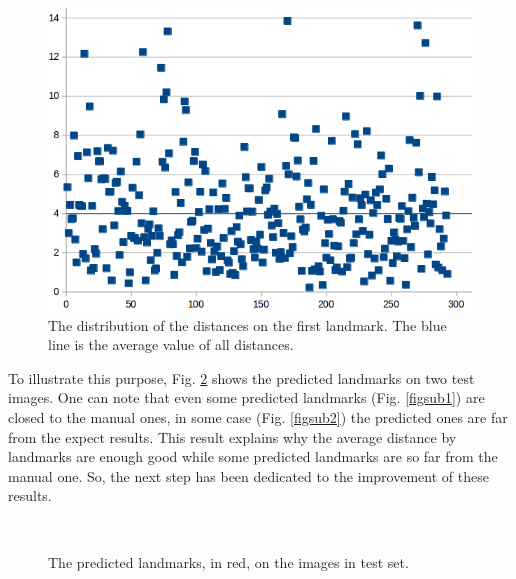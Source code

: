 \documentclass[review]{elsarticle}
\begin{document}
\begin{figure}[htbp]
	\centerline{\includegraphics[scale=0.3]{images/statistic_pronotum_from_scratch_lm1}}
	\caption{The distribution of the distances on the first landmark. The blue line is the average value of all distances.}
	\label{figchartlm1}
\end{figure}

To illustrate this purpose, Fig. \ref{figrsexample} shows the predicted landmarks on two test images. One can note that even some predicted landmarks (Fig. \ref{figsub1}) are closed to the manual ones, in some case (Fig. \ref{figsub2}) the predicted ones are far from the expect results. This result explains why the average distance by landmarks are enough good while some predicted landmarks are so far from the manual one. So, the next step has been dedicated to the improvement of these results.

\begin{figure}[htbp]
    \centering
    ~~
\\    
    \caption{The predicted landmarks, in red,  on the images in test set.}
    \label{figrsexample}
\end{figure}
\end{document}
